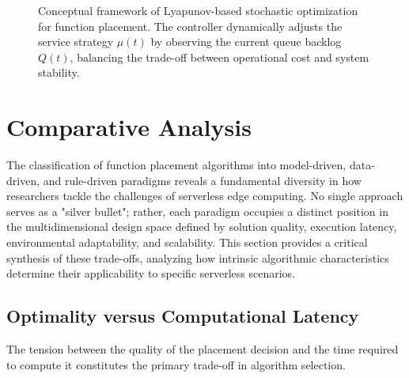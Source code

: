 \documentclass[lettersize,journal]{IEEEtran}
\begin{document}
\begin{figure}[!t]
    \caption{Conceptual framework of Lyapunov-based stochastic optimization for function placement. The controller dynamically adjusts the service strategy $\mu(t)$ by observing the current queue backlog $Q(t)$, balancing the trade-off between operational cost and system stability.}
    \label{fig:lyapunov_model}
\end{figure}

\section{Comparative Analysis}
\label{sec:comparison}

The classification of function placement algorithms into model-driven, data-driven, and rule-driven paradigms reveals a fundamental diversity in how researchers tackle the challenges of serverless edge computing. No single approach serves as a "silver bullet"; rather, each paradigm occupies a distinct position in the multidimensional design space defined by solution quality, execution latency, environmental adaptability, and scalability. This section provides a critical synthesis of these trade-offs, analyzing how intrinsic algorithmic characteristics determine their applicability to specific serverless scenarios.

\subsection{Optimality versus Computational Latency}
The tension between the quality of the placement decision and the time required to compute it constitutes the primary trade-off in algorithm selection.
\end{document}
